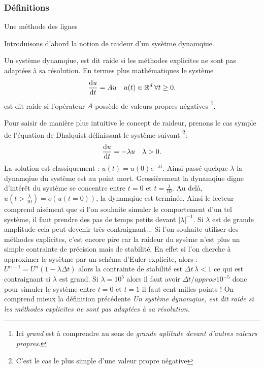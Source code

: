 \subsubsection{Définitions}
\begin{definition}
    Une méthode des lignes 
\end{definition}

Introduisons d'abord la notion de raideur d'un sysètme dynamqiue. 
\begin{definition}
    Un système dynamqiue, est dit raide si les méthodes explicites ne sont pas adaptées à sa résolution.
    En termes plus mathématiques le système 
    \begin{align}
    \frac{\text d u}{\text{d}t} = A u \quad u(t) \in \mathbb{R}^d \: \forall t\geq 0.
    \end{align}
    est dit raide si l'opérateur $A$ possède de  valeurs propres négatives
    \footnote{Ici \textit{grand} est à comprendre au sens de \textit{grande aplitude devant d'autres valeurs propres}.}.
\end{definition}

\begin{exemple}
    Pour saisir de manière plus intuitive le concept de raideur, prenons le cas symple de l'équation de Dhalquist définissant le système suivant
    \footnote{C'est le cas le plus simple d'une valeur propre négative}:
    \begin{align}
        \frac{\text d u }{\text d t} = - \lambda u\quad \lambda > 0.
    \end{align}
    La solution est classiquement : $u(t) = u(0)e^{-\lambda t}$. Ainsi passé quelque $\lambda$ la dynamqiue du système est au point mort. 
    Grossièrement la dynamqiue digne d'intérêt du système se concentre entre $t=0$ et $t=\frac{\lambda}{10}$. Au delà, $u(t>\frac{\lambda}{10}) = o(u(t=0))$, la dynamqiue est terminée.
    Ainsi le lecteur comprend aisément que si l'on souhaite simuler le comportement d'un tel système, il faut prendre des pas de temps petits devant $\vert \lambda \vert^{-1}$.
    Si $\lambda$ est de grande amplitude cela peut devenir très contraignant... Si l'on souhaite utiliser des méthodes explicites, c'est encore pire car la raideur du sysème 
    n'est plus un simple contrainte de précision mais de stabilité. En effet si l'on cherche à approximer le sysètme par un schéma d'Euler explicite, alors : 
    $U^{n+1} = U^n (1 - \lambda \Delta t)$ alors la contrainte de stabilité est $\Delta t \, \lambda < 1$ ce qui est contraignant si $\lambda$ est grand. 
    Si $\lambda = 10^5$ alors il faut avoir $\Delta t /approx 10^{-5}$ donc pour simuler le système entre $t=0$ et $t=1$ il faut cent-milles points !
    On comprend mieux la définition précédente \textit{Un système dynamqiue, est dit raide si les méthodes explicites ne sont pas adaptées à sa résolution.}
\end{exemple}